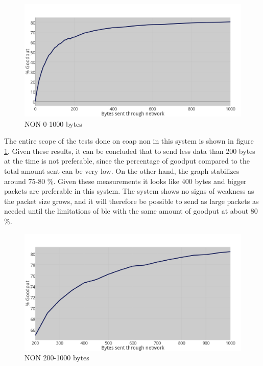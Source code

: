 \begin{figure}[ht]
    \centering
    \includegraphics[scale=1.0]{NON_0toKplotx09_thickerLineGRAY.png}    
    \caption{NON 0-1000 bytes}
    \label{fig:NON0-kb}
\end{figure}

The entire scope of the tests done on \gls{coap} \gls{non} in this system is shown in figure \ref{fig:NON0-kb}. Given these results, it can be concluded that to send less data than 200 bytes at the time is not preferable, since the percentage of goodput compared to the total amount sent can be very low. On the other hand, the graph stabilizes around 75-80 \%. Given these measurements it looks like 400 bytes and bigger packets are preferable in this system. The system shows no signs of weakness as the packet size grows, and it will therefore be possible to send as large packets as needed until the limitations of \gls{ble} with the same amount of goodput at about 80 \%. 

\begin{figure}[ht]
    \centering
    \includegraphics[scale=1.0]{NON_200toKplotx09_thickerLineGRAY.png}    
    \caption{NON 200-1000 bytes}
    \label{fig:NON200-kb}
\end{figure}



